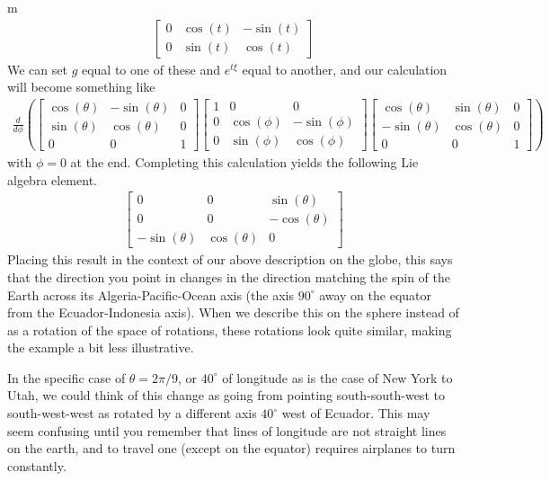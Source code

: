 \documentclass[11pt]{article}
\begin{document}
\begin{example}{m}
\begin{gather*}
\begin{bmatrix}
0 & \cos(t) & -\sin(t) \\
0 & \sin(t) & \cos(t)
\end{bmatrix}
\end{gather*}
We can set $g$ equal to one of these and $e^{t\xi}$ equal to another, and our calculation will become something like \begin{gather*}
\frac{d}{d\phi}\left(
\begin{bmatrix}
\cos(\theta) & -\sin(\theta) & 0 \\
\sin(\theta) & \cos(\theta) & 0 \\
0 & 0 & 1
\end{bmatrix}
\begin{bmatrix}
1 & 0 & 0 \\
0 & \cos(\phi) & -\sin(\phi) \\
0 & \sin(\phi) & \cos(\phi)
\end{bmatrix}
\begin{bmatrix}
\cos(\theta) & \sin(\theta) & 0 \\
-\sin(\theta) & \cos(\theta) & 0 \\
0 & 0 & 1
\end{bmatrix}
\right)
\end{gather*}
with $\phi = 0$ at the end. Completing this calculation yields the following Lie algebra element. \begin{gather*}
\begin{bmatrix}
0 & 0 & \sin(\theta) \\
0 & 0 & -\cos(\theta) \\
-\sin(\theta) & \cos(\theta) & 0
\end{bmatrix}
\end{gather*}
Placing this result in the context of our above description on the globe, this says that the direction you point in changes in the direction matching the spin of the Earth across its Algeria-Pacific-Ocean axis (the axis $90^\circ$ away on the equator from the Ecuador-Indonesia axis). When we describe this on the sphere instead of as a rotation of the space of rotations, these rotations look quite similar, making the example a bit less illustrative.

In the specific case of $\theta = 2\pi/9$, or $40^{\circ}$ of longitude as is the case of New York to Utah, we could think of this change as going from pointing south-south-west to south-west-west as rotated by a different axis $40^\circ$ west of Ecuador. This may seem confusing until you remember that lines of longitude are not straight lines on the earth, and to travel one (except on the equator) requires airplanes to turn constantly.
\end{example}
\end{document}
